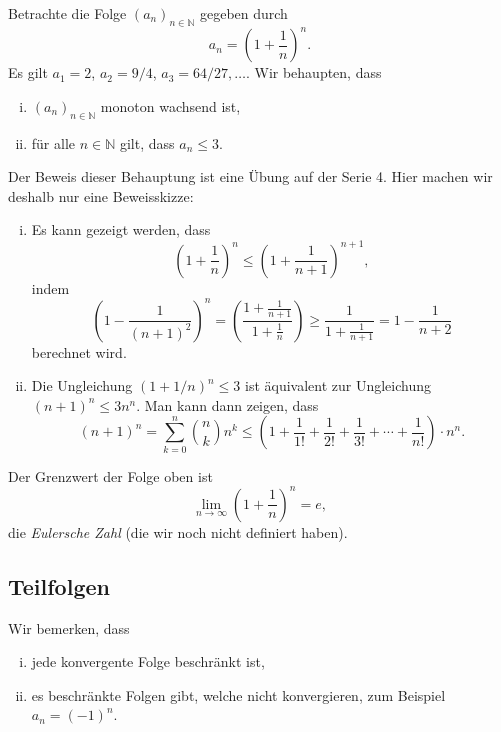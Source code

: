 \documentclass[../main.tex]{subfiles}
\begin{document}
\begin{example}
  Betrachte die Folge ${(a_n)}_{n \in \mathbb{N}}$ 
  gegeben durch
   \[
   a_n = {\left( 1 + \frac{1}{n} \right)}^n.
   \]
   Es gilt $a_1 = 2$, $a_2 = 9/4$, $a_3 = 64/27, \dots$.
   Wir behaupten, dass
   \begin{enumerate}[(i)]
     \item ${(a_n)}_{n \in \mathbb{N}}$ monoton wachsend ist,
     \item für alle $n \in \mathbb{N}$ gilt, dass
       $a_n \leq 3$.
   \end{enumerate}
   Der Beweis dieser Behauptung ist eine Übung auf
   der Serie 4. Hier machen wir deshalb nur eine Beweisskizze:
   \begin{enumerate}[(i)]
     \item Es kann gezeigt werden, dass
       \[
         {\left( 1 + \frac{1}{n} \right) }^n \leq
         {\left( 1 + \frac{1}{n+1} \right)}^{n+1},
       \]
       indem 
       \[
         {\left( 1 - \frac{1}{{(n+1)}^2} \right)}^n =
         {\left( \frac{1 + \frac{1}{n+1}}{1 + \frac{1}{n}} \right) }
         \geq \frac{1}{1 + \frac{1}{n+1}}
                       = 1 - \frac{1}{n+2}
       \]
       berechnet wird.
     \item
       Die Ungleichung ${(1 + 1/n)}^n \leq 3$ ist äquivalent
       zur Ungleichung ${(n + 1)}^n \leq 3n^n$.
       Man kann dann zeigen, dass
       \[
         {(n+1)}^n =
         \sum_{k=0}^{n} \binom{n}{k}n^k 
         \leq \left( 1 + \frac{1}{1!}
         + \frac{1}{2!} + \frac{1}{3!} + \cdots +
       \frac{1}{n!}\right) \cdot n^n.
       \]
   \end{enumerate}
\end{example}

\begin{remark}
  Der Grenzwert der Folge oben ist
  \[
    \lim_{n \to \infty} {\left( 1 + \frac{1}{n} \right)}^n = e,
  \]
  die \emph{Eulersche Zahl} (die wir noch nicht definiert haben).
\end{remark}

\subsection*{Teilfolgen}
Wir bemerken, dass
\begin{enumerate}[(i)]
  \item jede konvergente Folge beschränkt ist,
  \item es beschränkte Folgen gibt, welche nicht konvergieren,
    zum Beispiel $a_n = {(-1)}^n$.
\end{enumerate}
\end{document}
